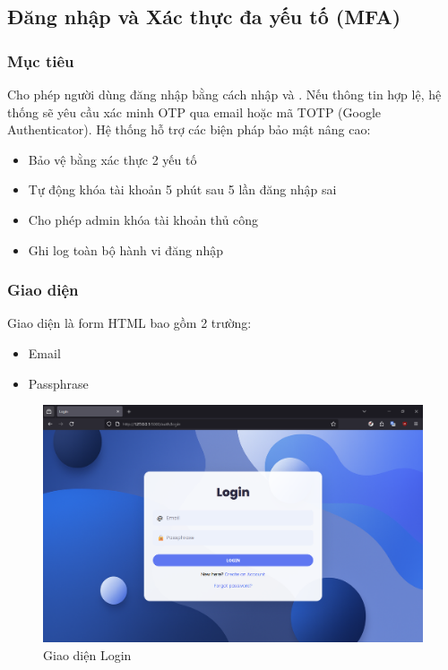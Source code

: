 \newpage
\subsection{Đăng nhập và Xác thực đa yếu tố (MFA)}
\subsubsection*{Mục tiêu}
Cho phép người dùng đăng nhập bằng cách nhập  và . Nếu thông tin hợp lệ, hệ thống sẽ yêu cầu xác minh OTP qua email hoặc mã TOTP (Google Authenticator). Hệ thống hỗ trợ các biện pháp bảo mật nâng cao:
\begin{itemize}
    \item Bảo vệ bằng xác thực 2 yếu tố
    \item Tự động khóa tài khoản 5 phút sau 5 lần đăng nhập sai
    \item Cho phép admin khóa tài khoản thủ công
    \item Ghi log toàn bộ hành vi đăng nhập
\end{itemize}
\subsubsection*{Giao diện}
Giao diện  là form HTML bao gồm 2 trường:
\begin{itemize}
    \item Email
    \item Passphrase
\end{itemize}
\begin{figure}[H]
\centering
\includegraphics[scale=0.34]{img/login.png}
\caption{Giao diện Login}
\label{fig:login_ui}
\end{figure}

